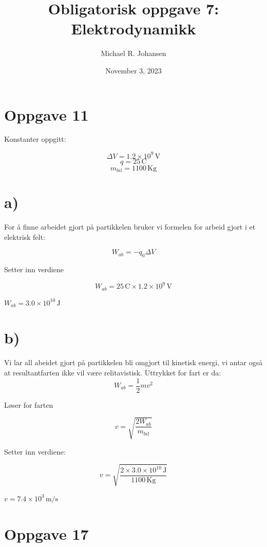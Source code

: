 \documentclass[a4paper,11pt]{article}
\begin{document}
\title{Obligatorisk oppgave 7: Elektrodynamikk}
\author{Michael R. Johansen}
\date{November 3, 2023}
\maketitle

\newpage
\section*{Oppgave 11}
\raggedright

Konstanter oppgitt:

$$\Delta V = 1.2 \times 10^9\, \mathrm{V}$$
$$q = 25\, \mathrm{C}$$
$$m_{bil} = 1100\, \mathrm{Kg}$$

\section*{a)}

For å finne arbeidet gjort på partikkelen bruker vi formelen for arbeid gjort i et elektrisk felt:

$$W_{ab} = -q_0 \Delta V$$

Setter inn verdiene

$$W_{ab} =  25\, \mathrm{C} \times 1.2 \times 10^9\, \mathrm{V}$$

\centerline{\underline{\underline{$W_{ab} = 3.0 \times 10^{10}\, \mathrm{J}$}}}

\section*{b)}

Vi lar all abeidet gjort på partikkelen bli omgjort til kinetisk energi, vi antar også at resultantfarten ikke vil være relitavistisk. Uttrykket for fart er da: 
$$W_{ab} = \frac{1}{2}mv^2$$

Løser for farten

$$v = \sqrt{\frac{2W_{ab}}{m_{bil}}}$$

Setter inn verdiene:

$$v = \sqrt{\frac{2 \times  3.0 \times 10^{10}\, \mathrm{J}}{ 1100\, \mathrm{Kg}}}$$

\centerline{\underline{\underline{$v = 7.4 \times 10^{3}\, \mathrm{m/s}$}}}

\newpage
\section*{Oppgave 17}
\end{document}
